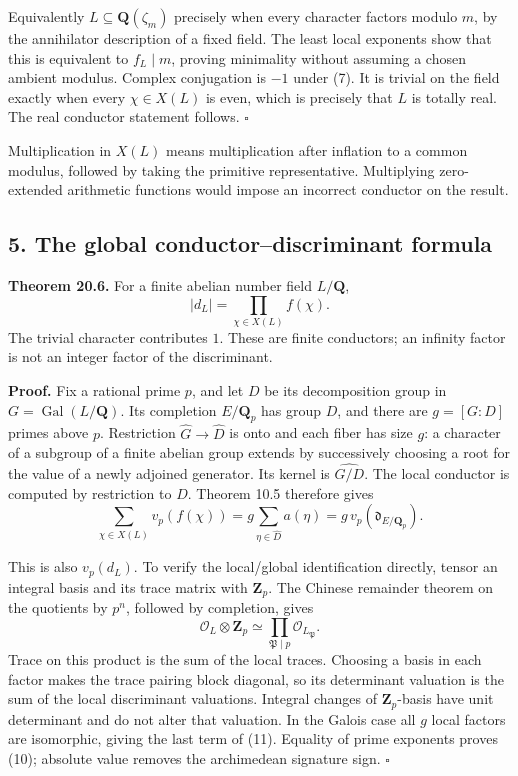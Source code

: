 \documentclass[11pt,a4paper]{article}
\begin{document}
Equivalently \(L\subseteq\mathbf Q(\zeta_m)\) precisely when every
character factors modulo \(m\), by the annihilator description of a
fixed field. The least local exponents show that this is equivalent to
\(f_L\mid m\), proving minimality without assuming a chosen ambient
modulus. Complex conjugation is \(-1\) under (7). It is trivial on the
field exactly when every \(\chi\in X(L)\) is even, which is precisely
that \(L\) is totally real. The real conductor statement follows.
\(\square\)

Multiplication in \(X(L)\) means multiplication after inflation to a
common modulus, followed by taking the primitive representative.
Multiplying zero-extended arithmetic functions would impose an incorrect
conductor on the result.

\subsection{5. The global conductor--discriminant
formula}\label{the-global-conductordiscriminant-formula}

\textbf{Theorem 20.6.} For a finite abelian number field
\(L/\mathbf Q\), \[
|d_L|=\prod_{\chi\in X(L)}f(\chi).
\tag{10}
\] The trivial character contributes \(1\). These are finite conductors;
an infinity factor is not an integer factor of the discriminant.

\textbf{Proof.} Fix a rational prime \(p\), and let \(D\) be its
decomposition group in \(G=\operatorname{Gal}(L/\mathbf Q)\). Its
completion \(E/\mathbf Q_p\) has group \(D\), and there are \(g=[G:D]\)
primes above \(p\). Restriction \(\widehat G\to\widehat D\) is onto and
each fiber has size \(g\): a character of a subgroup of a finite abelian
group extends by successively choosing a root for the value of a newly
adjoined generator. Its kernel is \(\widehat{G/D}\). The local conductor
is computed by restriction to \(D\). Theorem 10.5 therefore gives \[
\sum_{\chi\in X(L)}v_p(f(\chi))
=g\sum_{\eta\in\widehat D}a(\eta)
=g\,v_p(\mathfrak d_{E/\mathbf Q_p}).
\tag{11}
\]

This is also \(v_p(d_L)\). To verify the local/global identification
directly, tensor an integral basis and its trace matrix with
\(\mathbf Z_p\). The Chinese remainder theorem on the quotients by
\(p^n\), followed by completion, gives \[
\mathcal O_L\otimes\mathbf Z_p\simeq
\prod_{\mathfrak P\mid p}\mathcal O_{L_{\mathfrak P}}.
\] Trace on this product is the sum of the local traces. Choosing a
basis in each factor makes the trace pairing block diagonal, so its
determinant valuation is the sum of the local discriminant valuations.
Integral changes of \(\mathbf Z_p\)-basis have unit determinant and do
not alter that valuation. In the Galois case all \(g\) local factors are
isomorphic, giving the last term of (11). Equality of prime exponents
proves (10); absolute value removes the archimedean signature sign.
\(\square\)
\end{document}
